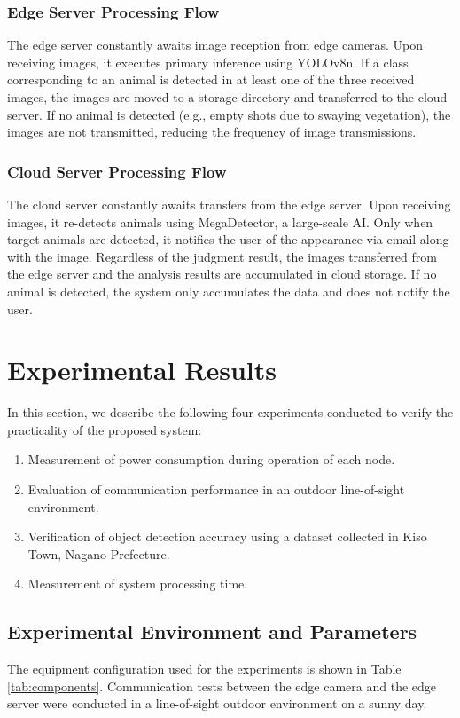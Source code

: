 \documentclass[conference]{IEEEtran}
\begin{document}
\subsubsection{Edge Server Processing Flow}
The edge server constantly awaits image reception from edge cameras. Upon receiving images, it executes primary inference using YOLOv8n. If a class corresponding to an animal is detected in at least one of the three received images, the images are moved to a storage directory and transferred to the cloud server. If no animal is detected (e.g., empty shots due to swaying vegetation), the images are not transmitted, reducing the frequency of image transmissions.

\subsubsection{Cloud Server Processing Flow}
The cloud server constantly awaits transfers from the edge server. Upon receiving images, it re-detects animals using MegaDetector, a large-scale AI. Only when target animals are detected, it notifies the user of the appearance via email along with the image. Regardless of the judgment result, the images transferred from the edge server and the analysis results are accumulated in cloud storage. If no animal is detected, the system only accumulates the data and does not notify the user.

\section{Experimental Results}
In this section, we describe the following four experiments conducted to verify the practicality of the proposed system:
\begin{enumerate}
    \item Measurement of power consumption during operation of each node.
    \item Evaluation of communication performance in an outdoor line-of-sight environment.
    \item Verification of object detection accuracy using a dataset collected in Kiso Town, Nagano Prefecture.
    \item Measurement of system processing time.
\end{enumerate}

\subsection{Experimental Environment and Parameters}
The equipment configuration used for the experiments is shown in Table \ref{tab:components}. Communication tests between the edge camera and the edge server were conducted in a line-of-sight outdoor environment on a sunny day.
\end{document}
